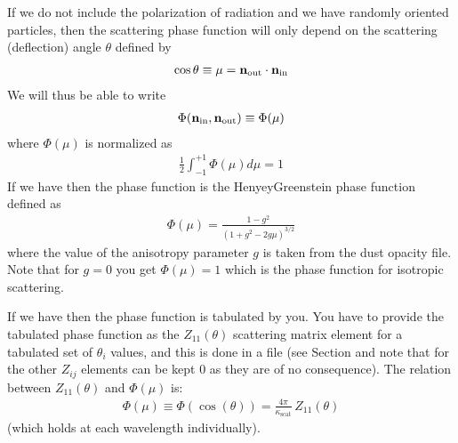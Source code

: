\documentclass[letterpaper,10pt,english]{sphinxmanual}
\begin{document}
If we do not include the polarization of radiation and we have randomly oriented
particles, then the scattering phase function will only depend on the scattering
(deflection) angle \(\theta\) defined by
\begin{equation*}
\begin{split}\cos\theta \equiv \mu = {\bf n}_{\mathrm{out}}\cdot {\bf n}_{\mathrm{in}}\end{split}
\end{equation*}
We will thus be able to write
\begin{equation*}
\begin{split}\Phi({\bf n}_{\mathrm{in}},{\bf n}_{\mathrm{out}})
\equiv \Phi(\mu)\end{split}
\end{equation*}
where \(\Phi(\mu)\) is normalized as
\begin{equation*}
\begin{split}\frac{1}{2}\int_{-1}^{+1} \Phi(\mu) d\mu = 1\end{split}
\end{equation*}
If we have  then the phase function is
the Henyey\sphinxhyphen{}Greenstein phase function defined as
\begin{equation*}
\begin{split}\Phi(\mu)=\frac{1-g^2}{(1+g^2-2g\mu)^{3/2}}\end{split}
\end{equation*}
where the value of the anisotropy parameter \(g\) is taken from the dust
opacity file. Note that for \(g=0\) you get \(\Phi(\mu)=1\) which is the
phase function for isotropic scattering.

If we have  then the phase function is
tabulated by you. You have to provide the tabulated phase function as the
\(Z_{11}(\theta)\) scattering matrix element for a tabulated set of \(\theta_i\)
values, and this is done in a file  (see
Section {\hyperref[\detokenize{inputoutputfiles:sec-dustkapscatmat-files}]{}} and note that for 
the other \(Z_{ij}\) elements can be kept 0 as they are
of no consequence). The relation between \(Z_{11}(\theta)\) and
\(\Phi(\mu)\) is:
\begin{equation*}
\begin{split}\Phi(\mu) \equiv \Phi(\cos(\theta)) = \frac{4\pi}{\kappa_{\mathrm{scat}}}\,Z_{11}(\theta)\end{split}
\end{equation*}
(which holds at each wavelength individually).
\end{document}

